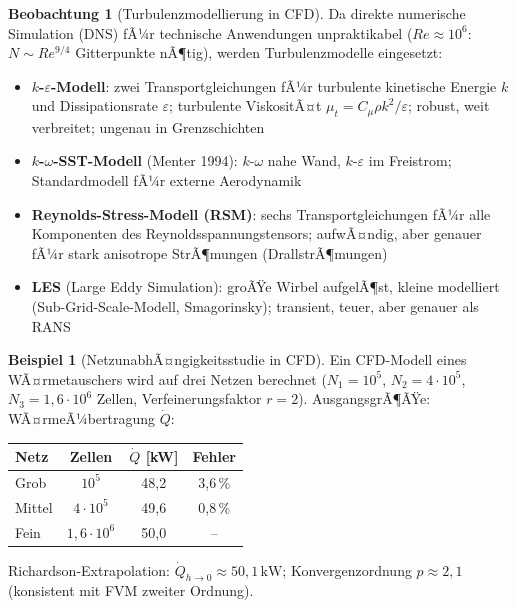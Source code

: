 ﻿\documentclass[a4paper,12pt]{report}
\theoremstyle{definition}
\newtheorem{beispiel}{Beispiel}
\newtheorem{beobachtung}{Beobachtung}
\begin{document}
\begin{beobachtung}[Turbulenzmodellierung in CFD]
Da direkte numerische Simulation (DNS) fÃ¼r technische Anwendungen unpraktikabel
($Re \approx 10^6$: $N \sim Re^{9/4}$ Gitterpunkte nÃ¶tig), werden Turbulenzmodelle eingesetzt:
\begin{itemize}
    \item[-] \textbf{$k$-$\varepsilon$-Modell}: zwei Transportgleichungen fÃ¼r
          turbulente kinetische Energie $k$ und Dissipationsrate $\varepsilon$;
          turbulente ViskositÃ¤t $\mu_t = C_\mu\rho k^2/\varepsilon$;
          robust, weit verbreitet; ungenau in Grenzschichten
    \item[-] \textbf{$k$-$\omega$-SST-Modell} (Menter 1994): $k$-$\omega$ nahe Wand,
          $k$-$\varepsilon$ im Freistrom; Standardmodell fÃ¼r externe Aerodynamik
    \item[-] \textbf{Reynolds-Stress-Modell (RSM)}: sechs Transportgleichungen
          fÃ¼r alle Komponenten des Reynoldsspannungstensors; aufwÃ¤ndig,
          aber genauer fÃ¼r stark anisotrope StrÃ¶mungen (DrallstrÃ¶mungen)
    \item[-] \textbf{LES} (Large Eddy Simulation): groÃŸe Wirbel aufgelÃ¶st,
          kleine modelliert (Sub-Grid-Scale-Modell, Smagorinsky);
          transient, teuer, aber genauer als RANS
\end{itemize}
\end{beobachtung}

\begin{beispiel}[NetzunabhÃ¤ngigkeitsstudie in CFD]
Ein CFD-Modell eines WÃ¤rmetauschers wird auf drei Netzen berechnet
($N_1 = 10^5$, $N_2 = 4\cdot10^5$, $N_3 = 1{,}6\cdot10^6$ Zellen,
Verfeinerungsfaktor $r = 2$). AusgangsgrÃ¶ÃŸe: WÃ¤rmeÃ¼bertragung $\dot{Q}$:
\begin{center}
\begin{tabular}{lccc}
\toprule
Netz & Zellen & $\dot{Q}$ [kW] & Fehler \\
\midrule
Grob & $10^5$ & 48{,}2 & 3{,}6\,\% \\
Mittel & $4\cdot10^5$ & 49{,}6 & 0{,}8\,\% \\
Fein & $1{,}6\cdot10^6$ & 50{,}0 & -- \\
\bottomrule
\end{tabular}
\end{center}
Richardson-Extrapolation: $\dot{Q}_{h\to0} \approx 50{,}1\,\mathrm{kW}$;
Konvergenzordnung $p \approx 2{,}1$ (konsistent mit FVM zweiter Ordnung).
\end{beispiel}
\end{document}
